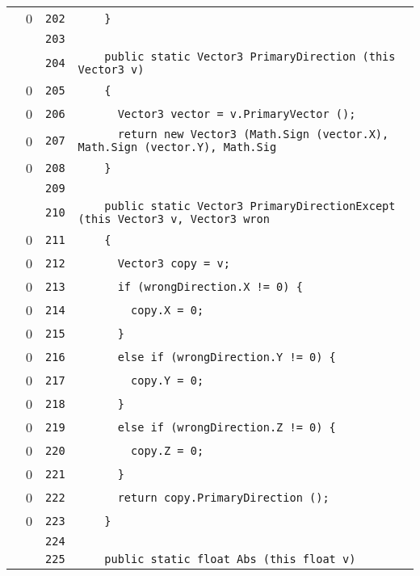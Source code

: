 \documentclass[a4paper,10pt]{article}
\begin{document}
\begin{longtable}[l]{lrrl}
\cellcolor{red} & 0 & \verb~202~ & \verb~    }~\\
\cellcolor{gray} &  & \verb~203~ & \verb~~\\
\cellcolor{gray} &  & \verb~204~ & \verb~    public static Vector3 PrimaryDirection (this Vector3 v)~\\
\cellcolor{red} & 0 & \verb~205~ & \verb~    {~\\
\cellcolor{red} & 0 & \verb~206~ & \verb~      Vector3 vector = v.PrimaryVector ();~\\
\cellcolor{red} & 0 & \verb~207~ & \verb~      return new Vector3 (Math.Sign (vector.X), Math.Sign (vector.Y), Math.Sig~\\
\cellcolor{red} & 0 & \verb~208~ & \verb~    }~\\
\cellcolor{gray} &  & \verb~209~ & \verb~~\\
\cellcolor{gray} &  & \verb~210~ & \verb~    public static Vector3 PrimaryDirectionExcept (this Vector3 v, Vector3 wron~\\
\cellcolor{red} & 0 & \verb~211~ & \verb~    {~\\
\cellcolor{red} & 0 & \verb~212~ & \verb~      Vector3 copy = v;~\\
\cellcolor{red} & 0 & \verb~213~ & \verb~      if (wrongDirection.X != 0) {~\\
\cellcolor{red} & 0 & \verb~214~ & \verb~        copy.X = 0;~\\
\cellcolor{red} & 0 & \verb~215~ & \verb~      }~\\
\cellcolor{red} & 0 & \verb~216~ & \verb~      else if (wrongDirection.Y != 0) {~\\
\cellcolor{red} & 0 & \verb~217~ & \verb~        copy.Y = 0;~\\
\cellcolor{red} & 0 & \verb~218~ & \verb~      }~\\
\cellcolor{red} & 0 & \verb~219~ & \verb~      else if (wrongDirection.Z != 0) {~\\
\cellcolor{red} & 0 & \verb~220~ & \verb~        copy.Z = 0;~\\
\cellcolor{red} & 0 & \verb~221~ & \verb~      }~\\
\cellcolor{red} & 0 & \verb~222~ & \verb~      return copy.PrimaryDirection ();~\\
\cellcolor{red} & 0 & \verb~223~ & \verb~    }~\\
\cellcolor{gray} &  & \verb~224~ & \verb~~\\
\cellcolor{gray} &  & \verb~225~ & \verb~    public static float Abs (this float v)~\\

\end{longtable}
\end{document}
